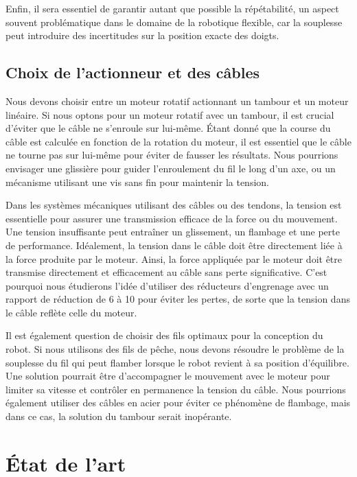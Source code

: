 \documentclass[a4paper, 11pt]{report}
\begin{document}
        Enfin, il sera essentiel de garantir autant que possible la répétabilité, un aspect souvent problématique dans le domaine de la robotique flexible, car la souplesse peut introduire des incertitudes sur la position exacte des doigts.

    \subsection{Choix de l'actionneur et des câbles}

        Nous devons choisir entre un moteur rotatif actionnant un tambour et un moteur linéaire. Si nous optons pour un moteur rotatif avec un tambour, il est crucial d'éviter que le câble ne s'enroule sur lui-même. Étant donné que la course du câble est calculée en fonction de la rotation du moteur, il est essentiel que le câble ne tourne pas sur lui-même pour éviter de fausser les résultats. Nous pourrions envisager une glissière pour guider l'enroulement du fil le long d'un axe, ou un mécanisme utilisant une vis sans fin pour maintenir la tension.

        Dans les systèmes mécaniques utilisant des câbles ou des tendons, la tension est essentielle pour assurer une transmission efficace de la force ou du mouvement. Une tension insuffisante peut entraîner un glissement, un flambage et une perte de performance. Idéalement, la tension dans le câble doit être directement liée à la force produite par le moteur. Ainsi, la force appliquée par le moteur doit être transmise directement et efficacement au câble sans perte significative. C'est pourquoi nous étudierons l'idée d'utiliser des réducteurs d'engrenage avec un rapport de réduction de 6 à 10 pour éviter les pertes, de sorte que la tension dans le câble reflète celle du moteur.

        Il est également question de choisir des fils optimaux pour la conception du robot. Si nous utilisons des fils de pêche, nous devons résoudre le problème de la souplesse du fil qui peut flamber lorsque le robot revient à sa position d'équilibre. Une solution pourrait être d'accompagner le mouvement avec le moteur pour limiter sa vitesse et contrôler en permanence la tension du câble. Nous pourrions également utiliser des câbles en acier pour éviter ce phénomène de flambage, mais dans ce cas, la solution du tambour serait inopérante.
        
\clearpage

\section{État de l'art}
\end{document}

